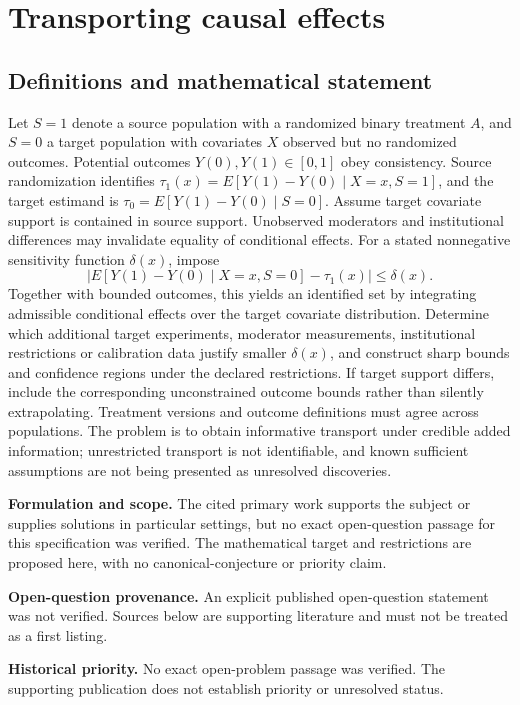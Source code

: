 \documentclass[11pt]{article}
\begin{document}
\section*{Transporting causal effects}\label{30007702}
\subsection{Definitions and mathematical statement}
Let \(S=1\) denote a source population with a randomized binary treatment \(A\), and \(S=0\) a target population with covariates \(X\) observed but no randomized outcomes. Potential outcomes \(Y(0),Y(1)\in[0,1]\) obey consistency. Source randomization identifies \(\tau_1(x)=E[Y(1)-Y(0)\mid X=x,S=1]\), and the target estimand is \(\tau_0=E[Y(1)-Y(0)\mid S=0]\). Assume target covariate support is contained in source support. Unobserved moderators and institutional differences may invalidate equality of conditional effects. For a stated nonnegative sensitivity function \(\delta(x)\), impose
\[
|E[Y(1)-Y(0)\mid X=x,S=0]-\tau_1(x)|\leq\delta(x).
\]
Together with bounded outcomes, this yields an identified set by integrating admissible conditional effects over the target covariate distribution. Determine which additional target experiments, moderator measurements, institutional restrictions or calibration data justify smaller \(\delta(x)\), and construct sharp bounds and confidence regions under the declared restrictions. If target support differs, include the corresponding unconstrained outcome bounds rather than silently extrapolating. Treatment versions and outcome definitions must agree across populations. The problem is to obtain informative transport under credible added information; unrestricted transport is not identifiable, and known sufficient assumptions are not being presented as unresolved discoveries.

\par\textbf{Formulation and scope.} The cited primary work supports the subject or supplies solutions in particular settings, but no exact open-question passage for this specification was verified. The mathematical target and restrictions are proposed here, with no canonical-conjecture or priority claim.

\par\textbf{Open-question provenance.} An explicit published open-question statement was not verified. Sources below are supporting literature and must not be treated as a first listing.

\par\textbf{Historical priority.} No exact open-problem passage was verified. The supporting publication does not establish priority or unresolved status.
\end{document}

